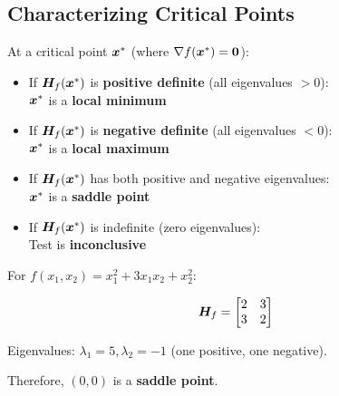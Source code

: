 \subsection{Characterizing Critical Points}

\begin{theorem}
At a critical point $\bm{x}^*$ (where $\nabla f(\bm{x}^*) = \bm{0}$):

\begin{itemize}
    \item If $\bm{H}_f(\bm{x}^*)$ is \textbf{positive definite} (all eigenvalues $> 0$): \\
    $\bm{x}^*$ is a \textbf{local minimum}
    
    \item If $\bm{H}_f(\bm{x}^*)$ is \textbf{negative definite} (all eigenvalues $< 0$): \\
    $\bm{x}^*$ is a \textbf{local maximum}
    
    \item If $\bm{H}_f(\bm{x}^*)$ has both positive and negative eigenvalues: \\
    $\bm{x}^*$ is a \textbf{saddle point}
    
    \item If $\bm{H}_f(\bm{x}^*)$ is indefinite (zero eigenvalues): \\
    Test is \textbf{inconclusive}
\end{itemize}
\end{theorem}

\begin{example}
For $f(x_1, x_2) = x_1^2 + 3x_1 x_2 + x_2^2$:

\begin{equation}
    \bm{H}_f = \begin{bmatrix} 2 & 3 \\ 3 & 2 \end{bmatrix}
\end{equation}

Eigenvalues: $\lambda_1 = 5, \lambda_2 = -1$ (one positive, one negative).

Therefore, $(0, 0)$ is a \textbf{saddle point}.
\end{example}

